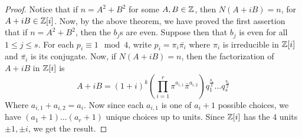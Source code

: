 \begin{proof}
    Notice that if $n=A^2+B^2$ for some  $A,B \in \mathbb{Z}$, then  $N(A+iB)=n$,
    for $A+iB \in \mathbb{Z}[i]$. Now, by the above theorem, we have proved the first
    assertion that if $n=A^2+B^2$, then the $b_j$s are even. Suppose then that
    $b_j$ is even for all  $1 \leq j \leq s$. For each  $p_i \equiv 1 \mod{4}$,
    write $p_i=\pi_i\bar{\pi_i}$ where $\pi_i$ is irreducible in $\mathbb{Z}[i]$ and
    $\bar{\pi_i}$ is its conjugate. Now, if $N(A+iB)=n$, then the factorization
    of $A+iB$ in  $\mathbb{Z}[i]$ is
    \begin{equation*}
        A+iB=(1+i)^k(\prod_{i=1}^r{\pi^{a_{i,1}}\bar{\pi}^{a_{i,2}}})
        q_1^{\frac{b_1}{2}} \dots q_s^{\frac{b_s}{2}}
    \end{equation*}
    Where $a_{i,1}+a_{i,2}=a_i$. Now since each $a_{i,1}$ is one of $a_i+1$
    possible choices, we have $(a_1+1) \dots (a_r+1)$ unique choices up to
    units. Since $\mathbb{Z}[i]$ has the $4$ units  $\pm 1, \pm i$, we get the result.
\end{proof}
